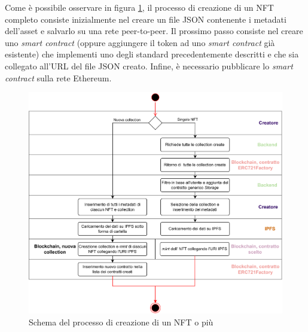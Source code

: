Come è possibile osservare in figura \ref{fig:creazioneNFT}, il processo di creazione di un NFT completo consiste inizialmente nel creare un file JSON contenente i metadati dell'asset e salvarlo su una rete peer-to-peer. Il prossimo passo consiste nel creare uno \textit{smart contract} (oppure aggiungere il token ad uno \textit{smart contract} già esistente) che implementi uno degli standard precedentemente descritti e che sia collegato all'URL del file JSON creato. Infine, è necessario pubblicare lo \textit{smart contract} sulla rete Ethereum.

\begin{figure}[H]
    \centering
    \includegraphics[width=1\textwidth]{images/creazioneNFT.png}
    \caption{Schema del processo di creazione di un NFT o più}
    \label{fig:creazioneNFT}
\end{figure}
